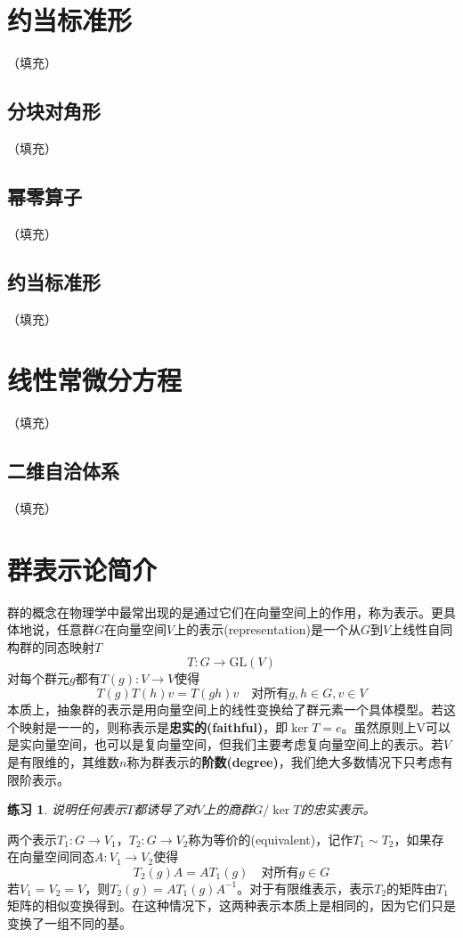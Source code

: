 \documentclass[hyperref,UTF8]{ctexbook}
\newtheorem*{exercise}{练习}
\begin{document}
\section{约当标准形}（填充）
\subsection{分块对角形}（填充）
\subsection{幂零算子}（填充）
\subsection{约当标准形}（填充）
\section{线性常微分方程}（填充）
\subsection{二维自洽体系}（填充）
\section{群表示论简介}
群的概念在物理学中最常出现的是通过它们在向量空间上的作用，称为表示。更具体地说，任意群$G$在向量空间$V$上的表示(representation)是一个从$G$到$V$上线性自同构群的同态映射$T$
$$T:G\rightarrow \mathrm{GL}(V)$$
对每个群元$g$都有$T(g):V\rightarrow V $使得
$$T(g)T(h)v=T(gh)v\quad\text{对所有}g,h\in G,v\in V$$
本质上，抽象群的表示是用向量空间上的线性变换给了群元素一个具体模型。若这个映射是一一的，则称表示是\textbf{忠实的(faithful)}，即$\ker T=e$。虽然原则上V可以是实向量空间，也可以是复向量空间，但我们主要考虑复向量空间上的表示。若$V$是有限维的，其维数$n$称为群表示的\textbf{阶数(degree)}，我们绝大多数情况下只考虑有限阶表示。
\begin{exercise}
    说明任何表示$T$都诱导了对$V$上的商群$G/ \ker T$的忠实表示。
\end{exercise}
两个表示$T_1:G\rightarrow V_1$，$T_2:G\rightarrow V_2$称为等价的(equivalent)，记作$T_1\sim T_2$，如果存在向量空间同态$A:V_1\rightarrow V_2$使得
\begin{equation}
    T_2(g)A=AT_1(g)\quad\text{对所有}g\in G \label{eq:4.32}
\end{equation}
若$V_1=V_2=V$，则$T_2(g)=AT_1(g)A^{-1}$。对于有限维表示，表示$T_2$的矩阵由$T_1$矩阵的相似变换得到。在这种情况下，这两种表示本质上是相同的，因为它们只是变换了一组不同的基。
\end{document}
